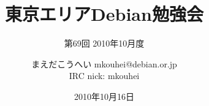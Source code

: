 




\documentclass[cjk,dvipdfmx,12pt]{beamer}
\usepackage{monthlypresentation}



\title{東京エリアDebian勉強会}
\subtitle{第69回 2010年10月度}
\author{まえだこうへい mkouhei@debian.or.jp\\IRC nick: mkouhei}
\date{2010年10月16日}



